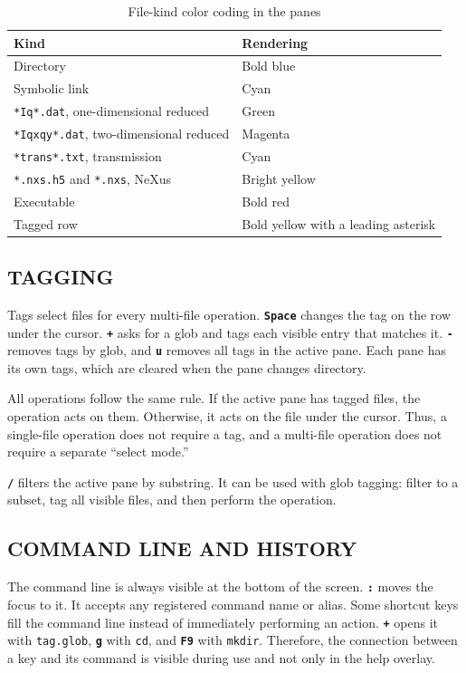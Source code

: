 \documentclass[tm]{ornltm}
\newcommand{\key}[1]{\textbf{\texttt{#1}}}
\begin{document}
\begin{table}[ht]
  \centering
  \caption{File-kind color coding in the panes}
  \label{tab:colors}
  \small
  \begin{tabular}{l l}
    \toprule
    Kind & Rendering \\
    \midrule
    Directory & Bold blue \\
    Symbolic link & Cyan \\
    \texttt{*Iq*.dat}, one-dimensional reduced & Green \\
    \texttt{*Iqxqy*.dat}, two-dimensional reduced & Magenta \\
    \texttt{*trans*.txt}, transmission & Cyan \\
    \texttt{*.nxs.h5} and \texttt{*.nxs}, NeXus & Bright yellow \\
    Executable & Bold red \\
    Tagged row & Bold yellow with a leading asterisk \\
    \bottomrule
  \end{tabular}
\end{table}

\subsection{TAGGING}

Tags select files for every multi-file operation. \key{Space} changes the tag
on the row under the cursor. \key{+} asks for a glob and tags each visible entry
that matches it. \key{-} removes tags by glob, and \key{u} removes all tags in
the active pane. Each pane has its own tags, which are cleared when the pane
changes directory.

All operations follow the same rule. If the active pane has tagged files, the
operation acts on them. Otherwise, it acts on the file under the cursor. Thus, a
single-file operation does not require a tag, and a multi-file operation does
not require a separate ``select mode.''

\key{/} filters the active pane by substring. It can be used with glob tagging:
filter to a subset, tag all visible files, and then perform the operation.

\subsection{COMMAND LINE AND HISTORY}

The command line is always visible at the bottom of the screen. \key{:} moves
the focus to it. It accepts any registered command name or alias. Some shortcut
keys fill the command line instead of immediately performing an action.
\key{+} opens it with \texttt{tag.glob}, \key{g} with \texttt{cd}, and \key{F9}
with \texttt{mkdir}. Therefore, the connection between a key and its command is
visible during use and not only in the help overlay.
\end{document}
